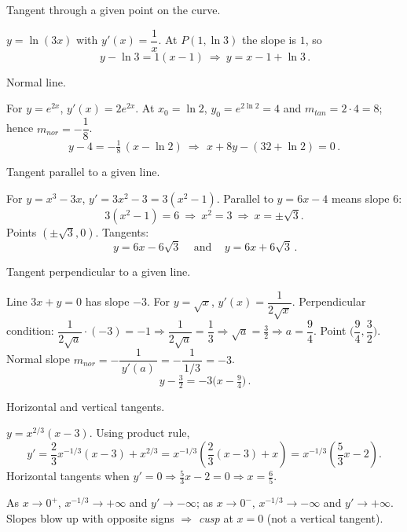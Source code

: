 \documentclass[11pt]{article}
\def\textbf#1{#1}%
\def\mathrm#1{#1}%
\begin{document}
\begin{solution}
\textbf{Tangent through a given point on the curve.}

$y=\ln(3x)$ with $y'(x)=\dfrac{1}{x}$.  
At $P(1,\ln3)$ the slope is $1$, so
\[
\boxed{\,y-\ln 3=1(x-1)\ \Rightarrow\ y=x-1+\ln 3\,}.
\]
\end{solution}

\begin{solution}
\textbf{Normal line.}

For $y=e^{2x}$, $y'(x)=2e^{2x}$.  
At $x_0=\ln 2$, $y_0=e^{2\ln 2}=4$ and $m_{\mathrm{tan}}=2\cdot 4=8$; hence $m_{\mathrm{nor}}=-\dfrac{1}{8}$.
\[
y-4=-\tfrac18\,(x-\ln2)\ \Longrightarrow\ \boxed{\,x+8y-(32+\ln 2)=0\,}.
\]
\end{solution}

\begin{solution}
\textbf{Tangent parallel to a given line.}

For $y=x^3-3x$, $y'=3x^2-3=3(x^2-1)$.  
Parallel to $y=6x-4$ means slope $6$:
\[
3(x^2-1)=6\ \Rightarrow\ x^2=3\ \Rightarrow\ x=\pm\sqrt{3}.
\]
Points $(\pm\sqrt{3},0)$. Tangents:
\[
\boxed{\,y=6x-6\sqrt{3}\,}\quad\text{and}\quad \boxed{\,y=6x+6\sqrt{3}\,}.
\]
\end{solution}

\begin{solution}
\textbf{Tangent perpendicular to a given line.}

Line $3x+y=0$ has slope $-3$.  
For $y=\sqrt{x}$, $y'(x)=\dfrac{1}{2\sqrt{x}}$.  
Perpendicular condition: $\dfrac{1}{2\sqrt{a}}\cdot(-3)=-1 \Rightarrow \dfrac{1}{2\sqrt{a}}=\dfrac{1}{3}\Rightarrow \sqrt{a}=\tfrac32\Rightarrow a=\dfrac{9}{4}$.
Point $\Big(\dfrac{9}{4},\dfrac{3}{2}\Big)$.  
Normal slope $m_{\mathrm{nor}}=-\dfrac{1}{\,y'(a)\,}=-\dfrac{1}{\,1/3\,}=-3$.
\[
\boxed{\,y-\tfrac{3}{2}=-3\Big(x-\tfrac{9}{4}\Big)\,}.
\]
\end{solution}

\begin{solution}
\textbf{Horizontal and vertical tangents.}

$y=x^{2/3}(x-3)$. Using product rule,
\[
y'=\frac{2}{3}x^{-1/3}(x-3)+x^{2/3}
= x^{-1/3}\!\left(\frac{2}{3}(x-3)+x\right)
= x^{-1/3}\!\left(\frac{5}{3}x-2\right).
\]
Horizontal tangents when $y'=0 \Rightarrow \tfrac{5}{3}x-2=0 \Rightarrow \boxed{x=\tfrac{6}{5}}$.

As $x\to 0^{+}$, $x^{-1/3}\to +\infty$ and $y'\to -\infty$; as $x\to 0^{-}$, $x^{-1/3}\to -\infty$ and $y'\to +\infty$.  
Slopes blow up with opposite signs $\Rightarrow$ \emph{cusp} at $x=0$ (not a vertical tangent).
\end{solution}
\end{document}
